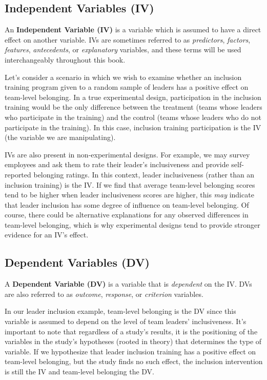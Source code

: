 \documentclass[
]{book}
\begin{document}
\hypertarget{independent-variables-iv}{%
\subsection{Independent Variables (IV)}\label{independent-variables-iv}}

An \textbf{Independent Variable (IV)} is a variable which is assumed to have a direct effect on another variable. IVs are sometimes referred to as \emph{predictors}, \emph{factors}, \emph{features}, \emph{antecedents}, or \emph{explanatory} variables, and these terms will be used interchangeably throughout this book.

Let's consider a scenario in which we wish to examine whether an inclusion training program given to a random sample of leaders has a positive effect on team-level belonging. In a true experimental design, participation in the inclusion training would be the only difference between the treatment (teams whose leaders who participate in the training) and the control (teams whose leaders who do not participate in the training). In this case, inclusion training participation is the IV (the variable we are manipulating).

IVs are also present in non-experimental designs. For example, we may survey employees and ask them to rate their leader's inclusiveness and provide self-reported belonging ratings. In this context, leader inclusiveness (rather than an inclusion training) is the IV. If we find that average team-level belonging scores tend to be higher when leader inclusiveness scores are higher, this \emph{may} indicate that leader inclusion has some degree of influence on team-level belonging. Of course, there could be alternative explanations for any observed differences in team-level belonging, which is why experimental designs tend to provide stronger evidence for an IV's effect.

\hypertarget{dependent-variables-dv}{%
\subsection{Dependent Variables (DV)}\label{dependent-variables-dv}}

A \textbf{Dependent Variable (DV)} is a variable that is \emph{dependent} on the IV. DVs are also referred to as \emph{outcome}, \emph{response}, or \emph{criterion} variables.

In our leader inclusion example, team-level belonging is the DV since this variable is assumed to depend on the level of team leaders' inclusiveness. It's important to note that regardless of a study's results, it is the positioning of the variables in the study's hypotheses (rooted in theory) that determines the type of variable. If we hypothesize that leader inclusion training has a positive effect on team-level belonging, but the study finds no such effect, the inclusion intervention is still the IV and team-level belonging the DV.
\end{document}
